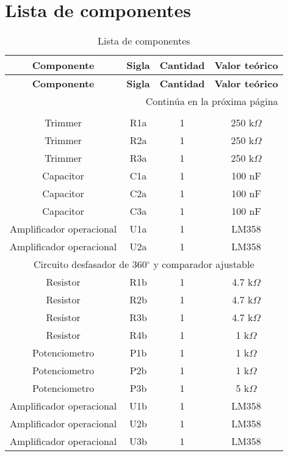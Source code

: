 \section{Lista de componentes}

\begin{longtable}{cccc}
\caption{Lista de componentes}\label{componentes} \\ 

\toprule
\textbf{Componente} & \textbf{Sigla} & \textbf{Cantidad} & \textbf{Valor te\'orico} \\ 
\midrule
\endfirsthead

\toprule
\textbf{Componente} & \textbf{Sigla} & \textbf{Cantidad} & \textbf{Valor te\'orico} \\ 
\midrule
\endhead

\midrule
\multicolumn{4}{r}{Contin\'ua en la pr\'oxima p\'agina} \\ 
\midrule
\endfoot

\bottomrule
\endlastfoot

\multicolumn{4}{c}{Oscilador en cuadratura} \\ 
\midrule
Trimmer & R1a & 1 & 250 k$\Omega$ \\  
Trimmer & R2a & 1 & 250 k$\Omega$ \\  
Trimmer & R3a & 1 & 250 k$\Omega$ \\  
Capacitor & C1a & 1 & 100 nF \\  
Capacitor & C2a & 1 & 100 nF \\  
Capacitor & C3a & 1 & 100 nF \\  
Amplificador operacional & U1a & 1 & LM358 \\  
Amplificador operacional & U2a & 1 & LM358 \\  

\midrule
\multicolumn{4}{c}{Circuito desfasador de 360$^\circ$ y comparador ajustable} \\ 
\midrule
Resistor & R1b & 1 & 4.7 k$\Omega$ \\  
Resistor & R2b & 1 & 4.7 k$\Omega$ \\  
Resistor & R3b & 1 & 4.7 k$\Omega$ \\  
Resistor & R4b & 1 & 1 k$\Omega$ \\
Potenciometro & P1b & 1 & 1 k$\Omega$ \\  
Potenciometro & P2b & 1 & 1 k$\Omega$ \\  
Potenciometro & P3b & 1 & 5 k$\Omega$ \\  
Amplificador operacional & U1b & 1 & LM358 \\
Amplificador operacional & U2b & 1 & LM358 \\
Amplificador operacional & U3b & 1 & LM358 \\


\end{longtable}
